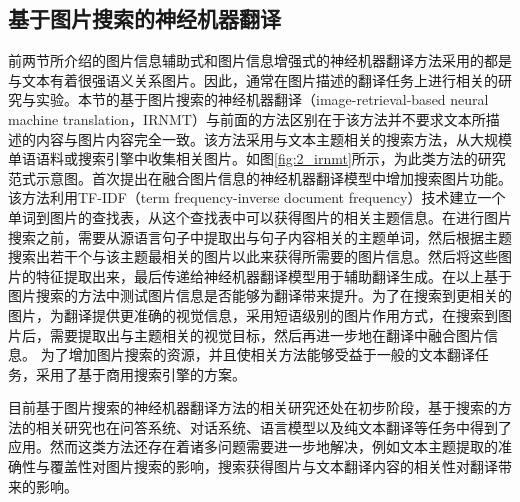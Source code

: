 \subsection{基于图片搜索的神经机器翻译}

前两节所介绍的图片信息辅助式和图片信息增强式的神经机器翻译方法采用的都是与文本有着很强语义关系图片。因此，通常在图片描述的翻译任务上进行相关的研究与实验。本节的基于图片搜索的神经机器翻译（image-retrieval-based neural machine translation，IRNMT）与前面的方法区别在于该方法并不要求文本所描述的内容与图片内容完全一致。该方法采用与文本主题相关的搜索方法，从大规模单语语料或搜索引擎中收集相关图片。如图\ref{fig:2_irnmt}所示，为此类方法的研究范式示意图。首次提出在融合图片信息的神经机器翻译模型中增加搜索图片功能。该方法利用TF-IDF（term frequency-inverse document frequency）技术建立一个单词到图片的查找表，从这个查找表中可以获得图片的相关主题信息。在进行图片搜索之前，需要从源语言句子中提取出与句子内容相关的主题单词，然后根据主题搜索出若干个与该主题最相关的图片以此来获得所需要的图片信息。然后将这些图片的特征提取出来，最后传递给神经机器翻译模型用于辅助翻译生成。在以上基于图片搜索的方法中测试图片信息是否能够为翻译带来提升。为了在搜索到更相关的图片，为翻译提供更准确的视觉信息，采用短语级别的图片作用方式，在搜索到图片后，需要提取出与主题相关的视觉目标，然后再进一步地在翻译中融合图片信息。
为了增加图片搜索的资源，并且使相关方法能够受益于一般的文本翻译任务，采用了基于商用搜索引擎的方案。

目前基于图片搜索的神经机器翻译方法的相关研究还处在初步阶段，基于搜索的方法的相关研究也在问答系统、对话系统、语言模型以及纯文本翻译等任务中得到了应用。然而这类方法还存在着诸多问题需要进一步地解决，例如文本主题提取的准确性与覆盖性对图片搜索的影响，搜索获得图片与文本翻译内容的相关性对翻译带来的影响。
